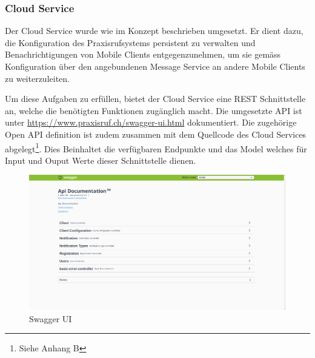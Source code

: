 \subsubsection{Cloud Service}

Der Cloud Service wurde wie im Konzept beschrieben umgesetzt.
Er dient dazu, die Konfiguration des Praxisrufsystems persistent zu verwalten und Benachrichtigungen von Mobile Clients entgegenzunehmen, um sie gemäss Konfiguration über den angebundenen Message Service an andere Mobile Clients zu weiterzuleiten.

Um diese Aufgaben zu erfüllen, bietet der Cloud Service eine REST Schnittstelle an, welche die benötigten Funktionen zugänglich macht.
Die umgesetzte API ist unter \url{https://www.praxisruf.ch/swagger-ui.html} dokumentiert.
Die zugehörige Open API definition ist zudem zusammen mit dem Quellcode des Cloud Services abgelegt\footnote{Siehe Anhang B}.
Dies Beinhaltet die verfügbaren Endpunkte und das Model welches für Input und Ouput Werte dieser Schnittstelle dienen.

\begin{figure}[h]
    \begin{minipage}[b]{1\textwidth}
        \includegraphics[width=\textwidth]{graphics/screenshots/cloud/swagger-home}
        \caption{Swagger UI}
    \end{minipage}
    \label{fig:swagger}
\end{figure}
\clearpage
